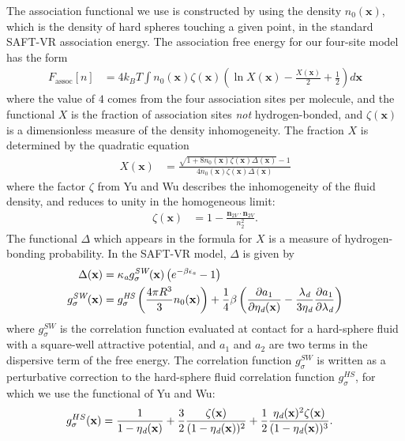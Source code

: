 \documentclass[letterpaper,twocolumn,amsmath,amssymb,prb]{revtex4-1}
\newcommand{\xx}{\textbf{x}}
\begin{document}
The association functional we use is constructed by using the density
$n_0(\xx)$, which is the density of hard spheres touching a given
point, in the standard SAFT-VR association
energy\cite{gil-villegas-1997-SAFT-VR}.
The association free energy for our four-site model has the form
\begin{align}
  F_\text{assoc}[n] &= 4 k_BT \int n_0(\xx) \zeta(\xx)
  \left(\ln X(\xx) - \frac{X(\xx)}{2} + \frac12\right) d\xx
\end{align}
where the value of $4$ comes from the four association sites per
molecule, and the functional $X$ is the fraction of association sites
\emph{not} hydrogen-bonded, and $\zeta(\xx)$ is a dimensionless
measure of the density inhomogeneity.
%
The fraction $X$ is determined by the quadratic equation
\begin{align}
  X(\xx) &= \frac{\sqrt{1 + 8n_0(\xx)\zeta(\xx)
      \Delta(\xx)} - 1}
  {4 n_0(\xx)\zeta(\xx)
    \Delta(\xx)}
\end{align}
where the factor $\zeta$ from Yu and
Wu\cite{yu2002fmt-dft-inhomogeneous-associating} describes the
inhomogeneity of the fluid density, and reduces to unity in the
homogeneous limit:
\begin{align}
  \zeta(\xx) &= 1 - \frac{\mathbf{n}_{2V}\cdot\mathbf{n}_{2V}}{n_2^2}.
\end{align}
The functional $\Delta$ which appears in the formula for $X$ is a
measure of hydrogen-bonding probability.  In the SAFT-VR
model\cite{gil-villegas-1997-SAFT-VR}, $\Delta$ is given by
\begin{align}
  \Delta(\xx) &= \kappaassoc g^\textit{SW}_\sigma(\xx)
  \left(e^{-\beta\epsilonassoc} - 1\right) \\
  g^\textit{SW}_\sigma(\xx) &= g^\textit{HS}_\sigma\left(\frac{4\pi R^3}{3}n_0(\xx)\right) +
  \frac{1}{4}\beta\left(\frac{\partial a_1}{\partial \etadisp(\xx)} -
  \frac{\lambdadisp}{3 \etadisp}\frac{\partial a_1}{\partial \lambdadisp}\right)\label{eq:gSW}
\end{align}
where $g^\textit{SW}_\sigma$ is the correlation function evaluated at
contact for a hard-sphere fluid with a square-well attractive
potential, and $a_1$ and $a_2$ are two terms in the dispersive term of
the free energy.  The correlation function $g^\textit{SW}_\sigma$ is
written as a perturbative correction to the hard-sphere fluid correlation
function $g^\textit{HS}_\sigma$, for which we use the functional of Yu and
Wu\cite{yu2002fmt-dft-inhomogeneous-associating}:
\begin{align}
  g_\sigma^{HS}(\xx) &= \frac{1}{1-\etadisp(\xx)}
  +\frac32\frac{\zeta(\xx)}{(1-\etadisp(\xx))^2}
  + \frac12\frac{\etadisp(\xx)^2\zeta(\xx)}{(1-\etadisp(\xx))^3}.
\end{align}
\end{document}
